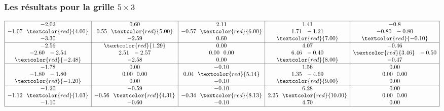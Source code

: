 \documentclass{beamer}
\begin{document}
\begin{frame}
\frametitle{Les résultats pour la grille $5\times 3$}
\hspace*{-0.95cm}$\begin{array}{|c|c|c|c|c|}
\hline
-2.02                           & 0.60                          & 2.11                           & 1.41                           & -0.8 \\
-1.07~ ~ \textcolor{red}{4.00}  & 0.55~ ~ \textcolor{red}{5.00} & -0.57~ ~ \textcolor{red}{6.00} & 1.71~ ~ -1.21                  & -0.80~ ~ -0.80 \\
-3.30                           & -2.59                         & 0.60                           & \textcolor{red}{7.00}          & \textcolor{red}{-0.10} \\
\hline
-2.56                         & \textcolor{red}{1.29}        & 0.00           & 4.07                            & -0.46 \\
-2.60~ ~ -2.54                & 2.51~ ~-2.57                 & 0.00~ ~ 0.00   & 6.46~ ~ -0.40                   & \textcolor{red}{3.46}~ ~ -0.50 \\
\textcolor{red}{-2.48}        & -2.58                        & 0.00           & \textcolor{red}{8.00}          & -0.47 \\
\hline
-1.78                          & 0.00          & -0.10          & 1.56                         & 0.00\\
-1.80~ ~ -1.80                 & 0.00~ ~ 0.00  & 0.04~ ~ \textcolor{red}{5.14}                     & 1.35~ ~ -4.69                & 0.00~ ~ 0.00 \\
\textcolor{red}{-1.20}         & 0.00          & -0.10                            & \textcolor{red}{9.00}        & 0.00 \\
\hline
-1.20                              & -0.59                          & -0.10                           &  6.28                           & 0.00 \\
-1.12~ ~ \textcolor{red}{1.03}     & -0.56~ ~ \textcolor{red}{4.31} & -0.34~ ~ \textcolor{red}{8.13}  &  2.25~ ~ \textcolor{red}{10.00} & 0.00~ ~ 0.00 \\
-1.10                              & -0.60                          & -0.10                           & 4.70                           & 0.00 \\
\hline
\end{array}
$
\end{frame}

\end{document}
